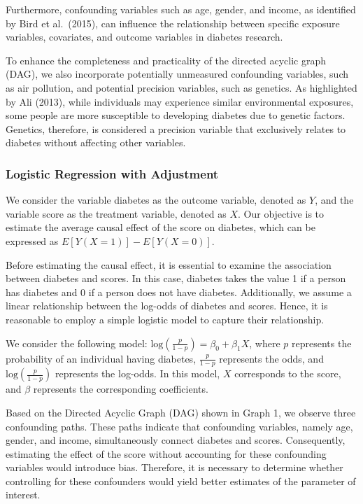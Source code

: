 \documentclass[
  12pt,
]{article}
\begin{document}
Furthermore, confounding variables such as age, gender, and income, as
identified by Bird et al.~(2015), can influence the relationship between
specific exposure variables, covariates, and outcome variables in
diabetes research.

To enhance the completeness and practicality of the directed acyclic
graph (DAG), we also incorporate potentially unmeasured confounding
variables, such as air pollution, and potential precision variables,
such as genetics. As highlighted by Ali (2013), while individuals may
experience similar environmental exposures, some people are more
susceptible to developing diabetes due to genetic factors. Genetics,
therefore, is considered a precision variable that exclusively relates
to diabetes without affecting other variables.

\hypertarget{logistic-regression-with-adjustment}{%
\subsubsection{Logistic Regression with
Adjustment}\label{logistic-regression-with-adjustment}}

We consider the variable diabetes as the outcome variable, denoted as
\(Y\), and the variable score as the treatment variable, denoted as
\(X\). Our objective is to estimate the average causal effect of the
score on diabetes, which can be expressed as \(E[Y(X=1)] - E[Y(X=0)]\).

Before estimating the causal effect, it is essential to examine the
association between diabetes and scores. In this case, diabetes takes
the value 1 if a person has diabetes and 0 if a person does not have
diabetes. Additionally, we assume a linear relationship between the
log-odds of diabetes and scores. Hence, it is reasonable to employ a
simple logistic model to capture their relationship.

We consider the following model:
\(\text{log}(\frac{p}{1-p}) = \beta_0 + \beta_1 X\), where \(p\)
represents the probability of an individual having diabetes,
\(\frac{p}{1-p}\) represents the odds, and \(\text{log}(\frac{p}{1-p})\)
represents the log-odds. In this model, \(X\) corresponds to the score,
and \(\beta\) represents the corresponding coefficients.

Based on the Directed Acyclic Graph (DAG) shown in Graph 1, we observe
three confounding paths. These paths indicate that confounding
variables, namely age, gender, and income, simultaneously connect
diabetes and scores. Consequently, estimating the effect of the score
without accounting for these confounding variables would introduce bias.
Therefore, it is necessary to determine whether controlling for these
confounders would yield better estimates of the parameter of interest.
\end{document}
